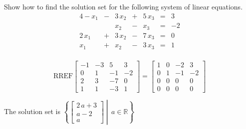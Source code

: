 
\begin{exerciseStatement}


Show how to find the solution set for the following system of linear equations. 
\begin{alignat*}{4} -x_{1} &-& 3 \, x_{2} &+& 5 \, x_{3} &=& 3 \\ & & x_{2} &-& x_{3} &=& -2 \\2 \, x_{1} &+& 3 \, x_{2} &-& 7 \, x_{3} &=& 0 \\x_{1} &+& x_{2} &-& 3 \, x_{3} &=& 1 \\ \end{alignat*}
            


\end{exerciseStatement}
    
\begin{exerciseAnswer} 
\[\mathrm{RREF} \left[\begin{array}{ccc|c}
-1 & -3 & 5 & 3 \\
0 & 1 & -1 & -2 \\
2 & 3 & -7 & 0 \\
1 & 1 & -3 & 1
\end{array}\right]  =  \left[\begin{array}{ccc|c}
1 & 0 & -2 & 3 \\
0 & 1 & -1 & -2 \\
0 & 0 & 0 & 0 \\
0 & 0 & 0 & 0
\end{array}\right] \]

The solution set is \( \left\{ \left[\begin{array}{c}
2 \, a + 3 \\
a - 2 \\
a
\end{array}\right] \middle|\,a\in\mathbb{R}\right\} \)


\end{exerciseAnswer}
    
